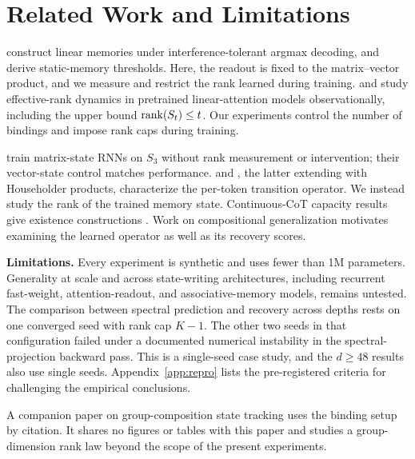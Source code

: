\section{Related Work and Limitations}
\label{sec:related}

\citet{nichani2025factual} construct linear memories under
interference-tolerant argmax decoding, and \citet{barnfield2026sharp}
derive static-memory thresholds. Here, the readout is fixed to the
matrix--vector product, and we measure and restrict the rank learned
during training. \citet{nazari2026rank} and \citet{sun2026staterank}
study effective-rank dynamics in pretrained linear-attention models
observationally, including the upper bound $\operatorname{rank}(S_t) \leq t$.
Our experiments control the number of bindings and impose rank caps
during training.

\citet{mishra2026m2rnn} train matrix-state RNNs on $S_3$ without rank
measurement or intervention; their vector-state control matches
performance. \citet{grazzi2025negative} and
\citet{siems2025deltaproduct}, the latter extending
\citet{yang2024deltanet} with Householder products, characterize the
per-token transition operator. We instead study the rank of the
trained memory state. Continuous-CoT capacity results give existence
constructions \citep{zhu2025superposition,gozeten2025cot2}. Work on
compositional generalization
\citep{dziri2023faithfate,wang2024grokked} motivates examining the
learned operator as well as its recovery scores.

\textbf{Limitations.} Every experiment is synthetic and uses fewer
than 1M parameters. Generality at scale and across state-writing
architectures, including recurrent fast-weight, attention-readout,
and associative-memory models, remains untested.
The comparison between spectral prediction and recovery across depths
rests on one converged seed with rank cap $K{-}1$. The other two
seeds in that configuration failed under a documented numerical
instability in the spectral-projection backward pass. This is a
single-seed case study, and the $d \geq 48$ results also use single
seeds. Appendix~\ref{app:repro} lists the pre-registered criteria
for challenging the empirical conclusions.

A companion paper on group-composition state tracking
\citep{larson2026ranklaw} uses the binding setup by citation. It shares
no figures or tables with this paper and studies a group-dimension
rank law beyond the scope of the present experiments.
